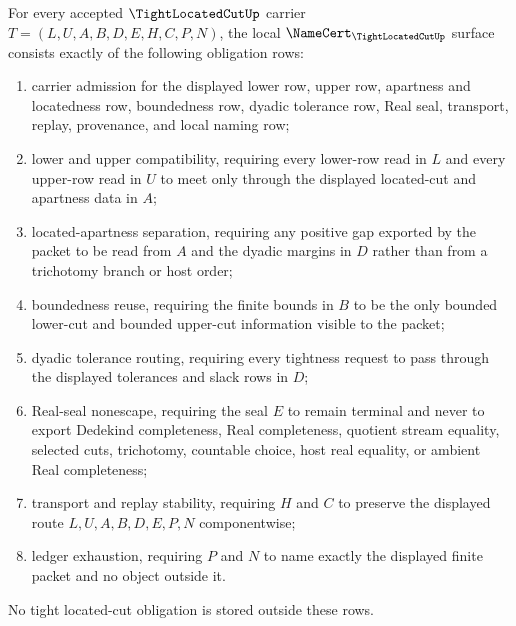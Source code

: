 \begin{theorem}
\label{thm:tight-located-cut-namecert-obligations}
For every accepted $\TightLocatedCutUp$ carrier $T=(L,U,A,B,D,E,H,C,P,N)$, the local $\NameCert_{\TightLocatedCutUp}$ surface consists exactly of the following obligation rows:
\begin{enumerate}
\item carrier admission for the displayed lower row, upper row, apartness and locatedness row, boundedness row, dyadic tolerance row, Real seal, transport, replay, provenance, and local naming row;
\item lower and upper compatibility, requiring every lower-row read in $L$ and every upper-row read in $U$ to meet only through the displayed located-cut and apartness data in $A$;
\item located-apartness separation, requiring any positive gap exported by the packet to be read from $A$ and the dyadic margins in $D$ rather than from a trichotomy branch or host order;
\item boundedness reuse, requiring the finite bounds in $B$ to be the only bounded lower-cut and bounded upper-cut information visible to the packet;
\item dyadic tolerance routing, requiring every tightness request to pass through the displayed tolerances and slack rows in $D$;
\item Real-seal nonescape, requiring the seal $E$ to remain terminal and never to export Dedekind completeness, Real completeness, quotient stream equality, selected cuts, trichotomy, countable choice, host real equality, or ambient Real completeness;
\item transport and replay stability, requiring $H$ and $C$ to preserve the displayed route $L,U,A,B,D,E,P,N$ componentwise;
\item ledger exhaustion, requiring $P$ and $N$ to name exactly the displayed finite packet and no object outside it.
\end{enumerate}
No tight located-cut obligation is stored outside these rows.
\end{theorem}
